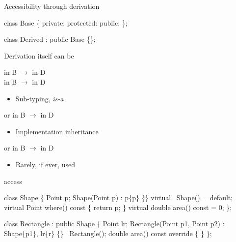 \begin{frame}[fragile]{Accessibility through derivation}

  \begin{codeblock}
class Base \{
 private:
  \ddd
 protected:
  \ddd
 public:
  \ddd
\};

class Derived : \alert{public} Base \{\};\end{codeblock}

  Derivation itself can be
  \begin{description}
    \item []  in B $\rightarrow$  in D\\
       in B $\rightarrow$  in D
      \begin{itemize}
      \item Sub-typing, \textit{is-a}
      \end{itemize}
    \item<2-> [\code{private}]  or  in B
      $\rightarrow$  in D
      \begin{itemize}
      \item Implementation inheritance
      \end{itemize}
    \item<3-> [\code{protected}]  or  in B
      $\rightarrow$  in D
      \begin{itemize}
      \item Rarely, if ever, used
      \end{itemize}
  \end{description}
\end{frame}

\begin{frame}[fragile]{ access}
  \begin{codeblock}
class Shape \{
  Point p;
  Shape(Point p) : p\{p\} \{\}
  virtual ~Shape() = default;
  virtual Point \alert<6>{where}() const \{ return p; \}
  virtual double area() const = 0;
\};

class Rectangle : \alert<1>{public} Shape \{
  Point lr;
  Rectangle(Point p1, Point p2) : Shape\{p1\}, lr\{r\} \{\}
  ~Rectangle();
  double area() const override \{ \ddd {} \ddd \}
\};\end{codeblock}


\end{frame}

